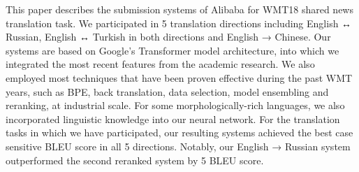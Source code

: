 This paper describes the submission systems of Alibaba for WMT18 shared news translation task. We participated in 5 translation directions including English ↔ Russian, English ↔ Turkish in both directions and English → Chinese. Our systems are based on Google's Transformer model architecture, into which we integrated the most recent features from the academic research. We also employed most techniques that have been proven effective during the past WMT years, such as BPE, back translation, data selection, model ensembling and reranking, at industrial scale. For some morphologically-rich languages, we also incorporated linguistic knowledge into our neural network. For the translation tasks in which we have participated, our resulting systems achieved the best case sensitive BLEU score in all 5 directions. Notably, our English → Russian system outperformed the second reranked system by 5 BLEU score.
